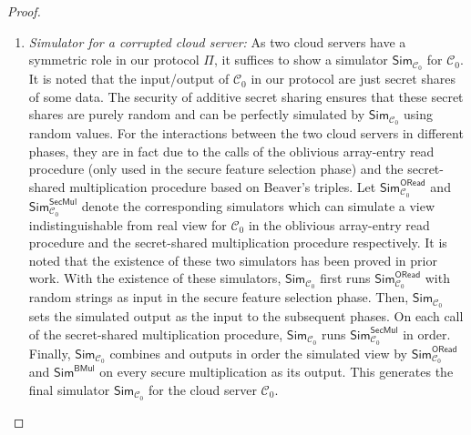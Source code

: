 \documentclass[10pt,journal,compsoc]{IEEEtran}
\begin{document}
\begin{proof}
\begin{enumerate}[-]
\item \emph{Simulator for a corrupted cloud server:} 
%
As two cloud servers have a symmetric role in our protocol $\Pi$, it suffices to show a simulator $\mathsf{Sim}_{\mathcal{C}_0}$ for $\mathcal{C}_0$.
%
It is noted that the input/output of $\mathcal{C}_0$ in our protocol are just secret shares of some data.
%
The security of additive secret sharing ensures that these secret shares are purely random and can be perfectly simulated by $\mathsf{Sim}_{\mathcal{C}_0}$ using random values.
% 
For the interactions between the two cloud servers in different phases, they are in fact due to the calls of the oblivious array-entry read procedure (only used in the secure feature selection phase) and the secret-shared multiplication procedure based on Beaver's triples.
%
%
Let $\mathsf{Sim}^{\mathsf{ORead}}_{\mathcal{C}_0}$ and $\mathsf{Sim}^{\mathsf{SecMul}}_{\mathcal{C}_0}$ denote the corresponding simulators which can simulate a view indistinguishable from real view for $\mathcal{C}_0$ in the oblivious array-entry read procedure and the secret-shared multiplication procedure respectively.
%
It is noted that the existence of these two simulators has been proved in prior work.
% 
With the existence of these simulators, $\mathsf{Sim}_{\mathcal{C}_0}$ first runs $\mathsf{Sim}^{\mathsf{ORead}}_{\mathcal{C}_0}$ with random strings as input in the secure feature selection phase. 
%
Then, $\mathsf{Sim}_{\mathcal{C}_0}$ sets the simulated output as the input to the subsequent phases.
%
On each call of the secret-shared multiplication procedure, $\mathsf{Sim}_{\mathcal{C}_0}$ runs $\mathsf{Sim}^{\mathsf{SecMul}}_{\mathcal{C}_0}$ in order.
% 
Finally, $\mathsf{Sim}_{\mathcal{C}_0}$ combines and outputs in order the simulated view by $\mathsf{Sim}^{\mathsf{ORead}}_{\mathcal{C}_0}$ and $\mathsf{Sim}^{\mathsf{BMul}}$ on every secure multiplication as its output.
%
%
This generates the final simulator $\mathsf{Sim}_{\mathcal{C}_0}$ for the cloud server $\mathcal{C}_0$.
%
%




\end{enumerate}
\end{proof}
\end{document}

